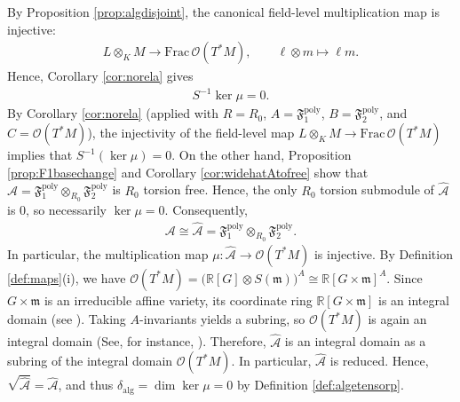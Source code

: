 \documentclass[11pt]{amsart}
\theoremstyle{definition}
\theoremstyle{plain}
\theoremstyle{conclusion}
\begin{document}
  


 By Proposition \ref{prop:algdisjoint}, the canonical field-level multiplication map is injective:
\begin{align*} L\otimes_K M\longrightarrow \mathrm{Frac}\,\mathcal{O}(T^*M),\qquad \ell\otimes m\longmapsto \ell m . \end{align*} Hence, Corollary \ref{cor:norela} gives \begin{align*}
S^{-1}\ker\mu=0 .
\end{align*} %
By Corollary \ref{cor:norela} (applied with $R=R_0$, $A=\mathfrak{F}_1^{\mathrm{poly}}$, $B=\mathfrak{F}_2^{\mathrm{poly}}$, and $C=\mathcal{O}(T^*M)$), the injectivity of the field-level map $L\otimes_K M\to \mathrm{Frac}\,\mathcal{O}(T^*M)$ implies that $S^{-1}(\ker\mu)=0$. %
On the other hand, Proposition \ref{prop:F1basechange} and Corollary \ref{cor:widehatAtofree} show that $\widehat{\mathcal{A}}  =\mathfrak{F}_1^{\mathrm{poly}} \otimes_{R_0}\mathfrak{F}_2^{\mathrm{poly}}$ is $R_0$ torsion free. Hence, the only $R_0$ torsion submodule of $\widehat{\mathcal{A}}$ is $0$, so necessarily $\ker\mu=0$. Consequently,
\begin{align*}
\mathcal{A}\cong\widehat{\mathcal{A}}=\mathfrak{F}_1^{\mathrm{poly}}\otimes_{R_0}\mathfrak{F}_2^{\mathrm{poly}}.
\end{align*}
In particular, the multiplication map $\mu:\widehat{\mathcal{A}}\to \mathcal{O}(T^*M)$ is injective. By Definition \ref{def:maps}(i), we have $\mathcal{O}(T^*M)=\bigl(\mathbb{R}[G]\otimes S(\mathfrak{m})\bigr)^A\cong \mathbb{R}[G\times\mathfrak{m}]^A$. Since $G\times\mathfrak{m}$ is an irreducible affine variety, its coordinate ring $\mathbb{R}[G\times\mathfrak{m}]$ is an integral domain (see \cite[Chapter 1, Proposition 3.1]{hartshorne2013algebraic}). Taking $A$-invariants yields a subring, so $\mathcal{O}(T^*M)$ is again an integral domain (See, for instance,  \cite[Section 1]{AtiyahMacdonald}). Therefore, $\widehat{\mathcal{A}}$ is an integral domain as a subring of the integral domain $\mathcal{O}(T^*M)$. In particular, $\widehat{\mathcal{A}}$ is reduced. Hence, $\sqrt{\widehat{\mathcal{A}}}=\widehat{\mathcal{A}}$, and thus $\delta_{\mathrm{alg}}= \dim \ker \mu =0$ by Definition \ref{def:algetensorp}.
\end{document}
